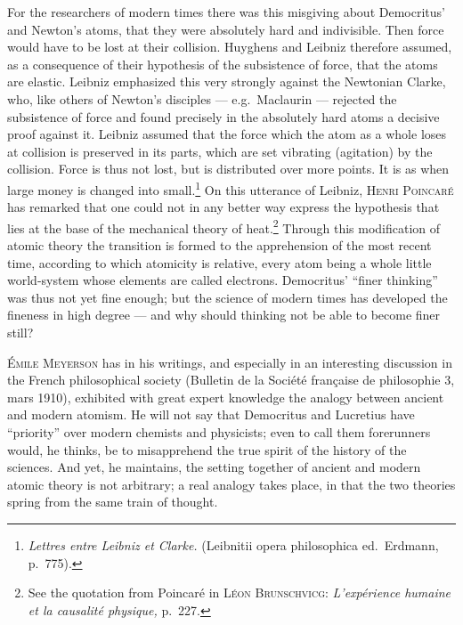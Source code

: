 \documentclass[12pt]{book}
\newcommand{\opage}[1]{\marginnote{\footnotesize\textit{[#1]}}}
\begin{document}
For the researchers of modern times there was this misgiving about Democritus'
and Newton's atoms, that they were absolutely hard and indivisible. Then force
would have to be lost at their collision. Huyghens and Leibniz therefore assumed,
as a consequence of their hypothesis of the subsistence of force, that the atoms
are elastic. Leibniz emphasized this very strongly against the Newtonian Clarke,
who, like others of Newton's disciples --- e.g.\ Maclaurin --- rejected the
subsistence of force and found precisely in the absolutely hard atoms a decisive
proof against it. Leibniz assumed that the force which the atom as a whole loses
at collision is preserved in its parts, which are set vibrating (agitation) by
the collision. Force is thus not lost, but is distributed over more points. It is
as when large money is changed into small.\footnote{\textit{Lettres entre Leibniz
et Clarke.} (Leibnitii opera philosophica ed.\ Erdmann, p.\ 775).} On this
utterance of Leibniz, \textsc{Henri Poincaré} has remarked that one could not in
any better way express the hypothesis that lies at the base of the mechanical
theory of heat.\footnote{See the quotation from Poincaré in \textsc{Léon
Brunschvicg:} \textit{L'expérience humaine et la causalité physique,} p.\ 227.}
Through this modification of atomic theory the transition is formed to the
apprehension of the most recent time, according to which atomicity is relative,
every atom being a whole little world-system whose elements are called electrons.
Democritus' ``finer thinking'' was thus \opage{73}not yet fine enough; but the science of
modern times has developed the fineness in high degree --- and why should
thinking not be able to become finer still?

\textsc{Émile Meyerson} has in his writings, and especially in an interesting
discussion in the French philosophical society (Bulletin de la Société française
de philosophie 3, mars 1910), exhibited with great expert knowledge the analogy
between ancient and modern atomism. He will not say that Democritus and Lucretius
have ``priority'' over modern chemists and physicists; even to call them
forerunners would, he thinks, be to misapprehend the true spirit of the history
of the sciences. And yet, he maintains, the setting together of ancient and
modern atomic theory is not arbitrary; a real analogy takes place, in that the
two theories spring from the same train of thought.
\end{document}
